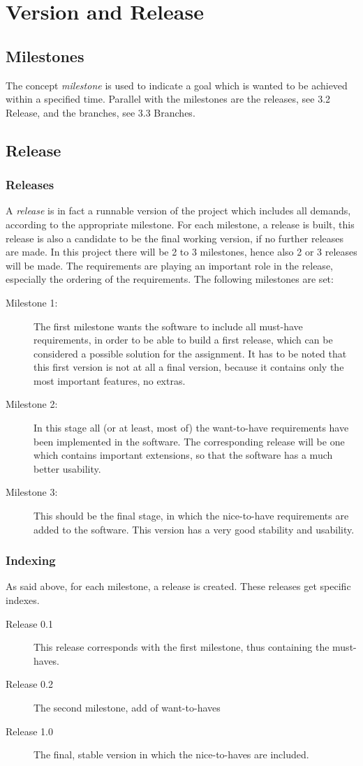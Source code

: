 \chapter{Version and Release}
\section{Milestones}
The concept {\it milestone} is used to indicate a goal which is wanted to be achieved within a specified time.
Parallel with the milestones are the releases, see 3.2 Release, and the branches, see 3.3 Branches.
\section{Release}
\subsection{Releases}
A {\it release} is in fact a runnable version of the project which includes all demands, according to the appropriate milestone.
For each milestone, a release is built, this release is also a candidate to be the final working version, if no further releases are made.
In this project there will be 2 to 3 milestones, hence also 2 or 3 releases will be made.
The requirements are playing an important role in the release, especially the ordering of the requirements.
The following milestones are set:
\begin{description}
\item[Milestone 1:]
The first milestone wants the software to include all must-have requirements, in order to be able to build a first release, which can be considered a possible solution for the assignment.
It has to be noted that this first version is not at all a final version, because it contains only the most important features, no extras.
\item[Milestone 2:]
In this stage all (or at least, most of) the want-to-have requirements have been implemented in the software.
The corresponding release will be one which contains important extensions, so that the software has a much better usability.
\item[Milestone 3:]
This should be the final stage, in which the nice-to-have requirements are added to the software. This version has a very good stability and usability.
\end{description}
\subsection{Indexing}
As said above, for each milestone, a release is created. These releases get specific indexes.
\begin{description}
\item[Release 0.1]
This release corresponds with the first milestone, thus containing the must-haves.
\item[Release 0.2]
The second milestone, add of want-to-haves
\item[Release 1.0]
The final, stable version in which the nice-to-haves are included.
\end{description}
